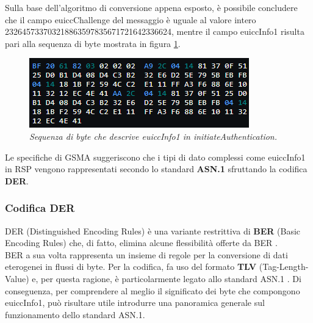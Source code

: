 \documentclass[10pt, oneside]{book}
\begin{document}
Sulla base dell'algoritmo di conversione appena esposto, è possibile concludere che il campo euiccChallenge del messaggio è uguale al valore intero 232645733703218863597835671721642336624, mentre il campo euiccInfo1 risulta pari alla sequenza di byte mostrata in figura \ref{fig:asn1-euiccInfo1}.\\
\begin{figure}
\includegraphics[width=\linewidth]{asn1-euiccInfo1.png}
\caption{\textit{Sequenza di byte che descrive euiccInfo1 in initiateAuthentication.}}
\label{fig:asn1-euiccInfo1}
\end{figure}
Le specifiche di GSMA \cite{GSMA-docs-new} suggeriscono che i tipi di dato complessi come euiccInfo1 in RSP vengono rappresentati secondo lo standard \textbf{ASN.1} sfruttando la codifica \textbf{DER}.

\subsubsection{Codifica DER}
DER (Distinguished Encoding Rules) è una variante restrittiva di \textbf{BER} (Basic Encoding Rules) che, di fatto, elimina alcune flessibilità offerte da BER \cite{DER}.\\
BER a sua volta rappresenta un insieme di regole per la conversione di dati eterogenei in flussi di byte. Per la codifica, fa uso del formato \textbf{TLV} (Tag-Length-Value) e, per questa ragione, è particolarmente legato allo standard ASN.1 \cite{BER}. Di conseguenza, per comprendere al meglio il significato dei byte che compongono euiccInfo1, può risultare utile introdurre una panoramica generale sul funzionamento dello standard ASN.1.
\end{document}
